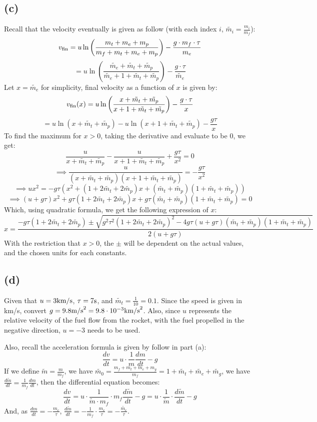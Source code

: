 \documentclass{article}
\begin{document}
\subsection*{(c)}
Recall that the velocity eventually is given as follow (with each index $i$, $\tilde{m_i} = \frac{m_i}{m_f}$):
$$v_\textmd{fin} = u\ln\left(\frac{m_t+m_e+m_p}{m_f+m_t+m_e+m_p}\right)-\frac{g\cdot m_f\cdot\tau}{m_e}$$
$$ = u\ln\left(\frac{\tilde{m_e}+\tilde{m_t}+\tilde{m_p}}{\tilde{m_e}+1+\tilde{m_t}+\tilde{m_p}}\right) - \frac{g\cdot \tau}{\tilde{m_e}}$$
Let $x=\tilde{m_e}$ for simplicity, final velocity as a function of $x$ is given by:
$$v_\textmd{fin}(x) = u\ln\left(\frac{x+\tilde{m_t}+\tilde{m_p}}{x+1+\tilde{m_t}+\tilde{m_p}}\right) - \frac{g\cdot\tau}{x}$$
$$ = u\ln(x+\tilde{m_t}+\tilde{m_p})-u\ln(x+1+\tilde{m_t}+\tilde{m_p})-\frac{g\tau}{x}$$
To find the maximum for $x>0$, taking the derivative and evaluate to be $0$, we get:
$$\frac{u}{x+\tilde{m_t}+\tilde{m_p}}-\frac{u}{x+1+\tilde{m_t}+\tilde{m_p}}+\frac{g\tau}{x^2} = 0$$
$$\implies \frac{u}{(x+\tilde{m_t}+\tilde{m_p})(x+1+\tilde{m_t}+\tilde{m_p})}=-\frac{g\tau}{x^2}$$
$$\implies ux^2 = -g\tau(x^2+(1+2\tilde{m_t}+2\tilde{m_p})x+(\tilde{m_t}+\tilde{m_p})(1+\tilde{m_t}+\tilde{m_p}))$$
$$\implies (u+g\tau)x^2+g\tau(1+2\tilde{m_t}+2\tilde{m_p})x+g\tau(\tilde{m_t}+\tilde{m_p})(1+\tilde{m_t}+\tilde{m_p})=0$$
Which, using quadratic formula, we get the following expression of $x$:
$$x=\frac{-g\tau(1+2\tilde{m_t}+2\tilde{m_p})\pm\sqrt{g^2\tau^2(1+2\tilde{m_t}+2\tilde{m_p})^2-4g\tau(u+g\tau)(\tilde{m_t}+\tilde{m_p})(1+\tilde{m_t}+\tilde{m_p})}}{2(u+g\tau)}$$
With the restriction that $x>0$, the $\pm$ will be dependent on the actual values, and the chosen units for each constants.

\subsection*{(d)}
Given that $u=3\textmd{km/s}$, $\tau = 7\textmd{s}$, and $\tilde{m_t}=\frac{1}{10}=0.1$. Since the speed is given in km/s, convert $g = 9.8 \textmd{m/s}^2 = 9.8\cdot 10^{-3}\textmd{km/s}^2$. Also, since $u$ represents the relative velocity of the fuel flow from the rocket, with the fuel propelled in the negative direction, $u=-3$ needs to be used.

Also, recall the acceleration formula is given by follow in part (a):
$$\frac{dv}{dt}=u\cdot\frac{1}{m}\frac{dm}{dt}-g$$
If we define $\tilde{m} = \frac{m}{m_f}$, we have $\tilde{m_0} = \frac{m_f+m_t+m_e+m_g}{m_f} = 1+\tilde{m_t}+\tilde{m_e}+\tilde{m_g}$, we have $\frac{d\tilde{m}}{dt} = \frac{1}{m_f}\frac{dm}{dt}$, then the differential equation becomes:
$$\frac{dv}{dt}=u\cdot \frac{1}{\tilde{m}\cdot m_f}\cdot m_f\frac{d\tilde{m}}{dt}-g = u\cdot\frac{1}{\tilde{m}}\cdot\frac{d\tilde{m}}{dt}-g$$
And, as $\frac{dm}{dt} = -\frac{m_e}{\tau}$, $\frac{d\tilde{m}}{dt} = -\frac{1}{m_f}\cdot \frac{m_e}{\tau} = -\frac{\tilde{m_e}}{\tau}$.
\end{document}
